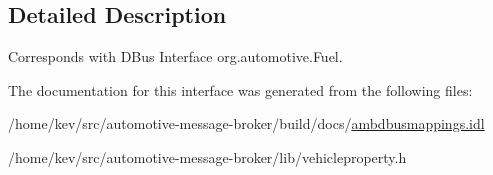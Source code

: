 \subsection{Detailed Description}
Corresponds with D\+Bus Interface org.\+automotive.\+Fuel. 

The documentation for this interface was generated from the following files\+:\begin{DoxyCompactItemize}
\item 
/home/kev/src/automotive-\/message-\/broker/build/docs/\hyperlink{ambdbusmappings_8idl}{ambdbusmappings.\+idl}\item 
/home/kev/src/automotive-\/message-\/broker/lib/vehicleproperty.\+h\end{DoxyCompactItemize}
